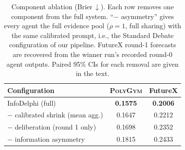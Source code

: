 \begin{table}[t]
\centering
\small
\caption{Component ablation (Brier$\,\downarrow$). Each row removes one component from the full system. ``$-$ asymmetry'' gives every agent the full evidence pool ($\rho{=}1$, full sharing) with the same calibrated prompt, i.e., the Standard Debate configuration of our pipeline. FutureX round-1 forecasts are recovered from the winner run's recorded round-0 agent outputs. Paired 95\% CIs for each removal are given in the text.}
\label{tab:ablation}
\begin{tabular}{lcc}
\toprule
Configuration & \textsc{PolyGym} & FutureX \\
\midrule
InfoDelphi (full) & \textbf{0.1575} & \textbf{0.2006} \\
$-$ calibrated shrink (mean agg.) & 0.1647 & 0.2212 \\
$-$ deliberation (round 1 only) & 0.1698 & 0.2352 \\
$-$ information asymmetry & 0.1815 & 0.2433 \\
\bottomrule
\end{tabular}
\end{table}
